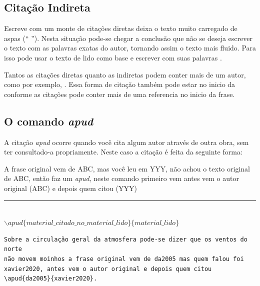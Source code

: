 \subsection{Citação Indireta}

Escreve com um monte de citações diretas deixa o texto muito carregado de aspas (``  ''). Nesta situação pode-se chegar a conclusão que não se deseja escrever o texto com as palavras exatas do autor, tornando assim o texto mais fluido. Para isso pode usar o texto de lido como base e escrever com suas palavras \cite{xavier2020}.


Tantos as citações diretas quanto as indiretas podem conter mais de um autor, como por exemplo, \cite{xavier2020, da2005}. Essa forma de citação também pode estar no inicio da conforme \textcite{xavier2020, da2005} as citações pode conter mais de uma referencia no inicio da frase. 



 \subsection{O comando \textit{apud}}

 
  \par A citação \textit{apud} ocorre quando você cita algum autor através de outra obra, sem ter consultado-a propriamente. Neste caso a citação é feita da seguinte forma:
   
   A frase original vem de ABC, mas você leu em YYY, não achou o texto original de ABC, então faz um \textit{apud}, neste comando primeiro vem antes vem o autor original (ABC) e depois quem citou (YYY)
  
  \begin{center}
  \rule{0.5\textwidth}{1pt}\\ 
  $\backslash apud\{material\_citado\_no\_material\_lido\}\{material\_lido\}$ \\
  \end{center}
\begin{verbatim}
Sobre a circulação geral da atmosfera pode-se dizer que os ventos do norte
não movem moinhos a frase original vem de da2005 mas quem falou foi xavier2020, antes vem o autor original e depois quem citou \apud{da2005}{xavier2020}. 
\end{verbatim}
  
